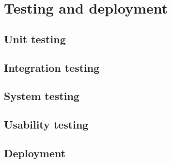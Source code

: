 \chapter{Testing and deployment}

\section{Unit testing}

\section{Integration testing}

\section{System testing}

\section{Usability testing}

\section{Deployment}
